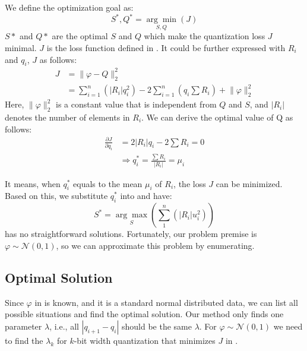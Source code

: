 We define the optimization goal as:
\begin{equation}
    S^*,Q^*=\underset{S,Q}{\arg\min}(J)
\end{equation}
$S*$ and $Q*$ are the optimal $S$ and $Q$ which make the quantization loss $J$ minimal. $J$ is the loss function defined in .
It could be further expressed with $R_i$ and $q_i$, $J$ as follows:
\begin{align}
\label{eqn:analysis_loss}
        J&=\lVert \varphi-Q \rVert_2^2\nonumber\\
        &=\sum_{i=1}^n(|R_i|q_i^2)-2\sum_{i=1}^n(q_i\sum R_i)+\lVert\varphi\rVert_2^2
\end{align}
Here, $\lVert\varphi\rVert_2^2$ is a constant value that is independent from $Q$ and $S$, and $|R_i|$ denotes the number of elements in $R_i$.
We can derive the optimal value of Q as follows:
\begin{align}
    \frac{\partial J}{\partial{q_i}}&=2|R_i|q_i-2\sum{R_i}=0\nonumber\\
    &\Longrightarrow q_i^*=\frac{\sum{R_i}}{|R_i|}=\mu_i
\end{align}

It means, when $q_i^*$ equals to the mean $\mu_i$ of $R_i$, the loss $J$ can be minimized. Based on this, we substitute $q_i^*$ into  and have:
\begin{equation}
\label{eqn:analysis_C}
    S^*=\underset{S}{\arg\max}(\sum_{1}^{n}(|R_i|u_i^2))
\end{equation}
 has no straightforward solutions. Fortunately, our problem premise is $\varphi\sim \mathcal{N}(0,1)$, so we can approximate this problem by enumerating.

\subsection{Optimal Solution}
Since $\varphi$ in  is known, and it is a standard normal distributed data, we can list all possible situations and find the optimal solution. Our method only finds one parameter $\lambda$, i.e., all $|q_{i+1}-q_{i}|$ should be the same $\lambda$. For $\varphi\sim \mathcal{N}(0,1)$ we need to find the $\lambda_k$ for $k$-bit width quantization that minimizes $J$ in . 

